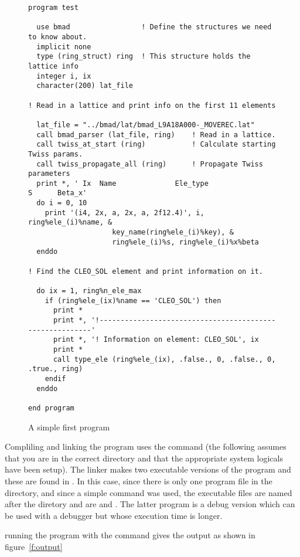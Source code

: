 \begin{figure}
\begin{verbatim}
program test

  use bmad                 ! Define the structures we need to know about.
  implicit none
  type (ring_struct) ring  ! This structure holds the lattice info
  integer i, ix
  character(200) lat_file

! Read in a lattice and print info on the first 11 elements

  lat_file = "../bmad/lat/bmad_L9A18A000-_MOVEREC.lat"
  call bmad_parser (lat_file, ring)    ! Read in a lattice.
  call twiss_at_start (ring)           ! Calculate starting Twiss params.
  call twiss_propagate_all (ring)      ! Propagate Twiss parameters
  print *, ' Ix  Name              Ele_type                   S      Beta_x'
  do i = 0, 10
    print '(i4, 2x, a, 2x, a, 2f12.4)', i, ring%ele_(i)%name, &
                    key_name(ring%ele_(i)%key), &
                    ring%ele_(i)%s, ring%ele_(i)%x%beta
  enddo

! Find the CLEO_SOL element and print information on it.

  do ix = 1, ring%n_ele_max
    if (ring%ele_(ix)%name == 'CLEO_SOL') then
      print *
      print *, '!---------------------------------------------------------'
      print *, '! Information on element: CLEO_SOL', ix
      print *
      call type_ele (ring%ele_(ix), .false., 0, .false., 0, .true., ring)
    endif
  enddo

end program
\end{verbatim}
\caption{A simple first program}
\label{f:program}
\end{figure}

Compliling and linking the program uses the  command (the
following assumes that you are in the correct directory and that the
appropriate system logicals have been setup). The linker makes two
executable versions of the program and these are found in .
In this case, since there is only one program file in the directory, and
since a simple  command was used, the executable files are
named after the diretory and are  and
. The latter program is a debug version
which can be used with a debugger but whose execution time is longer.

running the program with the command 
gives the output as shown in figure~\ref{f:output}


